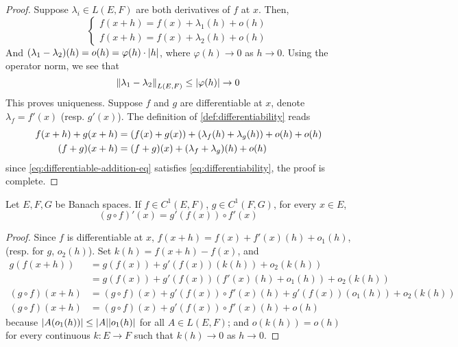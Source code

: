 \documentclass[../main-v2-manifolds.tex]{subfiles}
\begin{document}
\begin{proof}
    Suppose $\lambda_i\in L(E,F)$ are both derivatives of $f$ at $x$. Then,
    \[
        \begin{cases}
        f(x+h) = f(x) + \lambda_1(h) + o(h)\\
        f(x+h) = f(x) + \lambda_2(h) + o(h)
        \end{cases}
    \]
    And $(\lambda_1 - \lambda_2)(h) = o(h) = \varphi(h)\cdot\vert {h} \vert$, where $\varphi(h)\to 0$ as $h\to 0$. Using the operator norm, we see that
    \[
        \norm{\lambda_1-\lambda_2}_{L(E,F)}\leq \vert {\varphi(h)} \vert\to 0
    \]
    This proves uniqueness. Suppose $f$ and $g$ are differentiable at $x$, denote $\lambda_f = f'(x)$ (resp. $g'(x)$). The definition of \cref{def:differentiability} reads
    \begin{align}
        f(x+h) + g(x+h) &= \qty(f(x) + g(x)) + \qty(\lambda_f(h) + \lambda_g(h)) + o(h) + o(h)\nonumber\\
        (f + g)(x+h) &= (f+g)(x) + (\lambda_f + \lambda_g)(h) + o(h)\label{eq:differentiable-addition-eq}
    \end{align}
    since \cref{eq:differentiable-addition-eq} satisfies \cref{eq:differentiability}, the proof is complete.
\end{proof}
\begin{wts}\label{prop:chain-rule}
    Let $E, F, G$ be Banach spaces. If $f\in C^1(E,F)$, $g\in C^1(F,G)$, for every $x\in E$,
    \begin{equation}\label{eq:chain-rule}
        (g\circ f)'(x) = g'(f(x))\circ f'(x)
    \end{equation}
\end{wts}
\begin{proof}
    Since $f$ is differentiable at $x$, $f(x+h) = f(x) + f'(x)(h) + o_1(h)$, (resp. for $g$, $o_2(h)$). Set $k(h) = f(x+h) - f(x)$, and 
    \begin{align*}
        g(f(x+h)) &= g(f(x)) + g'(f(x))(k(h)) + o_2(k(h))\\
        &= g(f(x)) + g'(f(x))(f'(x)(h) + o_1(h)) + o_2(k(h))\\
        (g\circ f)(x+h) &= (g\circ f)(x) + g'(f(x))\circ f'(x)(h) + g'(f(x))(o_1(h)) + o_2(k(h))\\
        (g\circ f)(x+h) &= (g\circ f)(x) + g'(f(x))\circ f'(x)(h) + o(h)
    \end{align*}
    because $\vert {A(o_1(h))} \vert\leq \vert {A} \vert\vert {o_1(h)} \vert$ for all $A\in L(E,F)$; and $o(k(h)) = o(h)$ for every continuous $k: E\to F$ such that $k(h)\to 0$ as $h\to 0$.
\end{proof}
\end{document}
